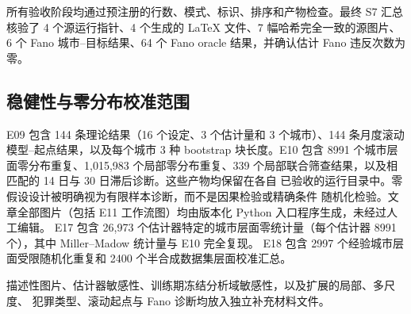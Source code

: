 所有验收阶段均通过预注册的行数、模式、标识、排序和产物检查。最终 S7
汇总核验了 4 个源运行指针、4 个生成的 LaTeX 文件、7 幅哈希完全一致的源图片、
6 个 Fano 城市--目标结果、64 个 Fano oracle 结果，并确认估计 Fano
违反次数为零。

\subsection{稳健性与零分布校准范围}
\label{app:robustness_scope}

E09 包含 144 条理论结果（16 个设定、3 个估计量和 3 个城市）、144
条月度滚动模型--起点结果，以及每个城市 3 种 bootstrap 块长度。E10
包含 8991 个城市层面零分布重复、1,015,983 个局部零分布重复、339
个局部联合筛查结果，以及相匹配的 14 日与 30 日滞后诊断。这些产物均保留在各自
已验收的运行目录中。零假设设计被明确视为有限样本诊断，而不是因果检验或精确条件
随机化检验。文章全部图片（包括 E11 工作流图）均由版本化 Python
入口程序生成，未经过人工编辑。
E17 包含 26,973 个估计器特定的城市层面零统计量（每个估计器 8991 个），其中
Miller--Madow 统计量与 E10 完全复现。
E18 包含 2997 个经验城市层面受限随机化重复和 2400 个半合成数据集层面校准汇总。

描述性图片、估计器敏感性、训练期冻结分析域敏感性，以及扩展的局部、多尺度、
犯罪类型、滚动起点与 Fano 诊断均放入独立补充材料文件。

